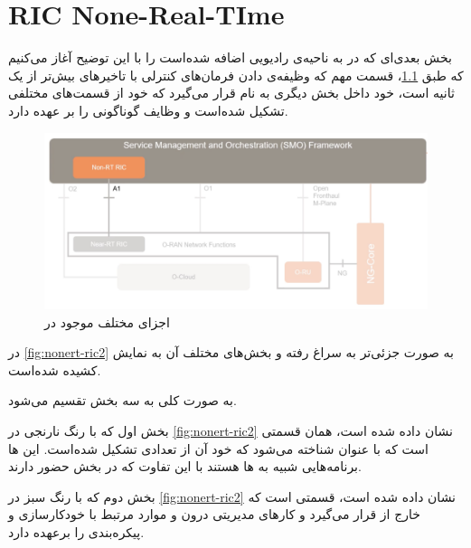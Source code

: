 \chapter{RIC None-Real-TIme}

بخش بعدی‌ای که در 
به ناحیه‌ی رادیویی اضافه شده‌است را با این توضیح آغاز می‌کنیم که طبق 
\ref{fig:nonert-ric1}،
قسمت مهم 
که وظیفه‌ی دادن فرمان‌های کنترلی با تاخیرهای بیش‌تر از یک ثانیه است، خود داخل بخش دیگری به نام
قرار می‌گیرد که خود از قسمت‌های مختلفی تشکیل شده‌است و وظایف گوناگونی را بر عهده دارد.

\begin{figure}[H]
	\includegraphics[width=0.85\columnwidth]{Picture/nonert-ric1.png}
	\centering
	\caption{اجزای مختلف موجود در
		}
	\label{fig:nonert-ric1}
\end{figure}

در 
\ref{fig:nonert-ric2}
به صورت جزئی‌تر به سراغ 
رفته‌ و بخش‌های مختلف آن به نمایش کشیده شده‌است.

به صورت کلی
به سه بخش تقسیم می‌شود.

بخش اول که با رنگ نارنجی در 
\ref{fig:nonert-ric2}
نشان داده شده است، همان قسمتی است که با عنوان 
شناخته می‌شود که خود آن از تعدادی
تشکیل شده‌است. این
ها
برنامه‌هایی شبیه به 
ها 
هستند با این تفاوت که در بخش 
حضور دارند.

بخش دوم که با رنگ سبز در 
\ref{fig:nonert-ric2}
نشان داده شده است، قسمتی است که خارج از
قرار می‌گیرد و کارهای مدیریتی درون 
و موارد مرتبط با خودکارسازی و پیکره‌بندی را برعهده دارد.

